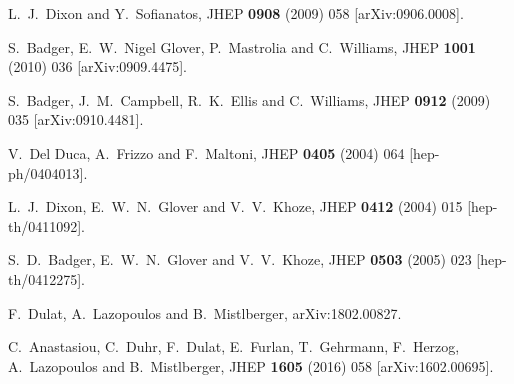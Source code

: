 \documentclass[12pt]{article}
\begin{document}
\begin{thebibliography}{99}
  L.~J.~Dixon and Y.~Sofianatos,
  JHEP {\bf 0908} (2009) 058
   [arXiv:0906.0008].


  S.~Badger, E.~W.~Nigel Glover, P.~Mastrolia and C.~Williams,
  JHEP {\bf 1001} (2010) 036
   [arXiv:0909.4475].


  S.~Badger, J.~M.~Campbell, R.~K.~Ellis and C.~Williams,
  JHEP {\bf 0912} (2009) 035
  [arXiv:0910.4481].



  V.~Del Duca, A.~Frizzo and F.~Maltoni,
  JHEP {\bf 0405} (2004) 064
  [hep-ph/0404013].

  L.~J.~Dixon, E.~W.~N.~Glover and V.~V.~Khoze,
  JHEP {\bf 0412} (2004) 015
  [hep-th/0411092].


  S.~D.~Badger, E.~W.~N.~Glover and V.~V.~Khoze,
  JHEP {\bf 0503} (2005) 023
  [hep-th/0412275].



  F.~Dulat, A.~Lazopoulos and B.~Mistlberger,
  arXiv:1802.00827.
  

  C.~Anastasiou, C.~Duhr, F.~Dulat, E.~Furlan, T.~Gehrmann, F.~Herzog, A.~Lazopoulos and B.~Mistlberger,
  JHEP {\bf 1605} (2016) 058
   [arXiv:1602.00695].


\end{thebibliography}
\end{document}
